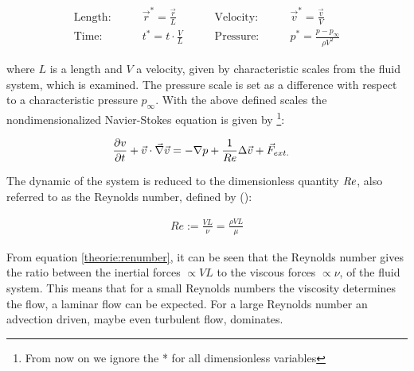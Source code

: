 \begin{align}
    \text{Length:}\qquad &  \vec{r}^* = \frac{\vec{r}}{L}  & \qquad \text{Velocity:}\qquad& \vec{v}^* = \frac{\vec{v}}{V}\\
    \text{Time:}  \qquad & t^* = t \cdot \frac{V}{L}      & \qquad  \text{Pressure:}\qquad & p^* = \frac{p - p_\infty}{\rho V^2}
\end{align}

where  $L$ is a length and $V$  a velocity, given by characteristic scales from the fluid system, which is examined.
The pressure scale is set as a difference with respect to a characteristic pressure $p_\infty$.
With the above defined scales the nondimensionalized Navier-Stokes equation is given by \footnote{
From now on we ignore the * for all dimensionless variables }:

\begin{align}
    \pdn[v]{t} + \vec{v} \cdot \vec{\nabla} \vec{v} &= -\nabla p + \frac{1}{Re} \Delta \vec{v} + \vec{F}_{ext.}
\end{align}

The dynamic of the system is reduced to the dimensionless quantity $\Rey$, also referred to as the Reynolds number,
defined by (\citep{Kundu2012}):

\begin{align}
    \label{theorie:renumber}
    Re := \frac{VL}{\nu} = \frac{\rho VL}{\mu}
\end{align}

From equation \ref{theorie:renumber}, it can be seen that the Reynolds number gives the ratio between the inertial forces $\propto VL$
to the viscous forces $\propto \nu$, of the fluid system.
This means that for a small Reynolds numbers the viscosity determines the flow, a laminar flow can be expected.
For a large Reynolds number an  advection driven, maybe even turbulent flow, dominates.\\

%
\clearpage

